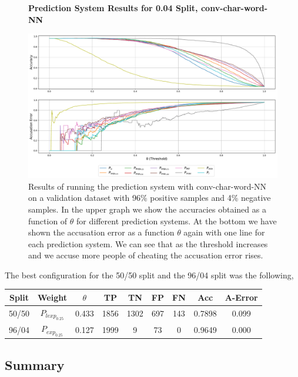 \begin{figure}
    \centering
    \textbf{Prediction System Results for 0.04 Split, \gls{conv-char-word-NN}}\par\medskip
    \includegraphics[scale=0.33]{./pictures/experiments/conv_char_word_nn/prediction_system_04}
    \caption{Results of running the prediction system with
        \gls{conv-char-word-NN} on a validation dataset with 96\% positive
        samples and 4\% negative samples. In the upper graph we show the
        accuracies obtained as a function of $\theta$ for different prediction
        systems. At the bottom we have shown the accusation error as a function
        $\theta$ again with one line for each prediction system. We can see that
        as the threshold increases and we accuse more people of cheating the
        accusation error rises.}
    \label{fig:conv-char-word-NN-pred-4}
\end{figure}

The best configuration for the 50/50 split and the 96/04 split was the
following,

\begin{center}
    \begin{tabular}{|c|c|c|c|c|c|c|c|c|}
        \hline
        Split & Weight            & $\theta$ & TP   & TN   & FP  & FN  & Acc     & A-Error \\ \hline
        50/50 & $P_{lexp_{0.25}}$ & 0.433    & 1856 & 1302 & 697 & 143 & 0.7898 & 0.099   \\ \hline
        96/04 & $P_{exp_{0.25}}$  & 0.127    & 1999 & 9    & 73  & 0   & 0.9649 & 0.000   \\ \hline
    \end{tabular}
\end{center}


\subsection{Summary}

